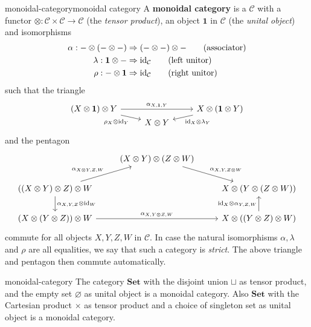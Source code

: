 \begin{topic}{monoidal-category}{monoidal category}
    A \textbf{monoidal category} is a  $\mathcal{C}$ with a functor $\otimes : \mathcal{C} \times \mathcal{C} \to \mathcal{C}$ (the \textit{tensor product}), an object $\textbf{1}$ in $\mathcal{C}$ (the \textit{unital object}) and  isomorphisms
    \[ \begin{aligned}
        \alpha : - \otimes (- \otimes -) &\Rightarrow (- \otimes -) \otimes - \qquad \text{(associator)} \\
        \lambda : \textbf{1} \otimes - &\Rightarrow \text{id}_{\mathcal{C}} \qquad \text{(left unitor)} \\
        \rho : - \otimes \textbf{1} &\Rightarrow \text{id}_{\mathcal{C}} \qquad \text{(right unitor)}
    \end{aligned} \]
    such that the triangle
    \[ \begin{tikzcd}[row sep=0em] (X \otimes \textbf{1}) \otimes Y \arrow{rr}{\alpha_{X,\textbf{1},Y}} \arrow[swap]{rd}{\rho_X \otimes \id_Y} & & X \otimes (\textbf{1} \otimes Y) \arrow{ld}{\id_X \otimes \lambda_Y} \\ & X \otimes Y & \end{tikzcd} \]
    and the pentagon
    \[ \begin{tikzcd} & (X \otimes Y) \otimes (Z \otimes W) \arrow{rd}{\alpha_{X, Y, Z \otimes W}} & \\ ((X \otimes Y) \otimes Z) \otimes W \arrow{ur}{\alpha_{X \otimes Y, Z, W}} \arrow{d}{\alpha_{X,Y,Z} \otimes \id_W} & & X \otimes (Y \otimes (Z \otimes W)) \\ (X \otimes (Y \otimes Z)) \otimes W \arrow{rr}{\alpha_{X, Y \otimes Z, W}} & & X \otimes ((Y \otimes Z) \otimes W) \arrow{u}{\id_X \otimes \alpha_{Y, Z, W}} \end{tikzcd} \]
    commute for all objects $X, Y, Z, W$ in $\mathcal{C}$. In case the natural isomorphisms $\alpha, \lambda$ and $\rho$ are all equalities, we say that such a category is \textit{strict}. The above triangle and pentagon then commute automatically.
\end{topic}

\begin{example}{monoidal-category}
    The category $\textbf{Set}$ with the disjoint union $\sqcup$ as tensor product, and the empty set $\varnothing$ as unital object is a monoidal category. Also $\textbf{Set}$ with the Cartesian product $\times$ as tensor product and a choice of singleton set as unital object is a monoidal category.
\end{example}

